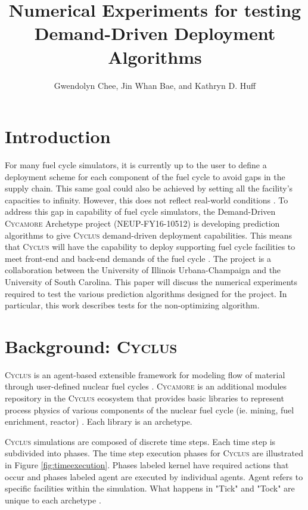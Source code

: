 \documentclass{anstrans}
\title{Numerical Experiments for testing Demand-Driven Deployment Algorithms}
\author{Gwendolyn Chee, Jin Whan Bae, and Kathryn D. Huff}
\institute{
Dept. of Nuclear, Plasma and Radiological Engineering, University of Illinois at Urbana-Champaign \\
gchee2@illinois.edu
}
\newcommand{\Cyclus}{\textsc{Cyclus}\xspace}%
\newcommand{\Cycamore}{\textsc{Cycamore}\xspace}%
\begin{document}
\section{Introduction}
For many fuel cycle simulators, it is currently up to the user to define a 
deployment scheme for each component of the fuel cycle to avoid gaps in the 
supply chain. This same goal could also be achieved by setting all the 
facility's capacities to infinity. However, this does not reflect real-world 
conditions \cite{bae_numerical_2018}. To address this gap in capability of fuel 
cycle simulators, the Demand-Driven \Cycamore Archetype project 
(NEUP-FY16-10512) is developing prediction algorithms to give \Cyclus 
demand-driven deployment capabilities. This means that \Cyclus will have the 
capability to deploy supporting fuel cycle facilities to meet front-end and 
back-end demands of the fuel cycle \cite{bae_numerical_2018}. The project is a 
collaboration between the University of Illinois Urbana-Champaign and the 
University of South Carolina. This paper will discuss the numerical experiments 
required to test the various prediction algorithms designed for the project. In 
particular, this work describes tests for the non-optimizing algorithm. 

\section{Background: \Cyclus}
\Cyclus \cite{carlsen_cyclus_2014} is an agent-based extensible framework for modeling flow of material through user-defined nuclear fuel cycles \cite{huff_fundamental_2016}. \Cycamore \cite{carlsen_cycamore_2014} is an additional modules repository in the \Cyclus ecosystem that provides basic libraries to represent process physics of various components of the nuclear fuel cycle (ie. mining, fuel enrichment, reactor) \cite{huff_extensions_2014}. Each library is an archetype. 

\Cyclus simulations are composed of discrete time steps. Each time step is 
subdivided into phases. The time step execution phases for \Cyclus are 
illustrated in Figure \ref{fig:timeexecution}. 
Phases labeled kernel have required actions that occur and phases labeled agent are executed by individual agents. Agent refers to specific facilities within the simulation. What happens in "Tick" and "Tock" are unique to each archetype \cite{bae_numerical_2018}. 
\end{document}
